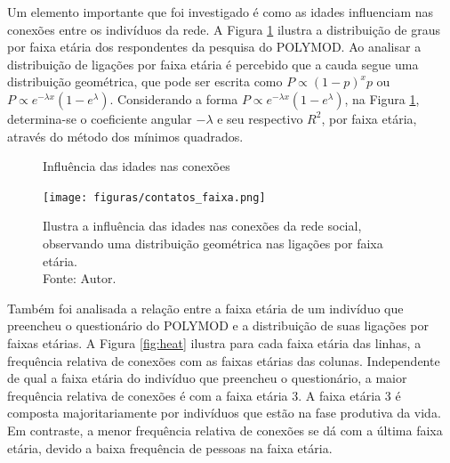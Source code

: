 Um elemento importante que foi investigado
é como as idades influenciam nas conexões entre os indivíduos da rede. A Figura \ref{fig:contatos_faixa} ilustra a distribuição de graus por faixa etária dos respondentes da pesquisa do POLYMOD.
Ao analisar a distribuição de ligações por faixa etária é percebido que a cauda segue uma distribuição geométrica, que pode ser escrita como $P \propto (1 - p)^xp$ ou $P \propto e^{-\lambda x}(1 - e^\lambda)$. 
Considerando a forma $P \propto e^{-\lambda x}(1 - e^\lambda)$, na Figura \ref{fig:contatos_faixa}, determina-se o coeficiente angular $-\lambda$ e seu respectivo $R^2$, por faixa etária, através do método dos mínimos quadrados.

\begin{figure}[H]
    \centering
    \captionsetup{font=normalsize,skip=0.8pt,singlelinecheck=on,labelsep=endash}
    \caption{Influência das idades nas conexões}
    \texttt{[image: figuras/contatos\_faixa.png]}
    \captionsetup{font=small,justification=justified}
    \caption*{Ilustra a influência das idades nas 
    conexões da rede social, observando uma distribuição geométrica nas ligações por faixa etária.\\ Fonte: Autor.}
    \label{fig:contatos_faixa}
\end{figure}

Também foi analisada a relação entre a faixa etária de um indivíduo que preencheu o questionário do POLYMOD e a distribuição de suas ligações 
por faixas etárias.
A Figura \ref{fig:heat} ilustra para cada faixa etária das linhas, a frequência relativa de conexões com as faixas etárias das colunas. 
Independente de qual a faixa etária do indivíduo que preencheu o questionário, a maior frequência relativa de conexões é com a faixa etária 3. A faixa etária 3 é
composta majoritariamente por indivíduos que estão na fase produtiva da vida.
Em contraste, 
a menor frequência relativa de conexões se dá com a última faixa etária, devido a baixa frequência de pessoas na faixa etária.


